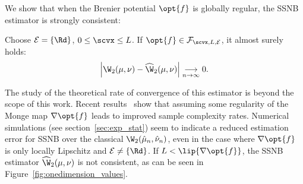 We show that when the Brenier potential $\opt{f}$ is globally regular, the SSNB estimator is strongly consistent:
\begin{proposition}\label{prop:estimation:L2}
Choose $\mathcal{E} = \{\Rd\}$, $0 \leq \scvx \leq L$. If $\opt{f} \in \mathcal{F}_{\scvx, L, \mathcal{E}}$, it almost surely holds:
\[
    \left\vert \W_2(\mu, \nu) - \widehat \W_2(\mu,\nu) \right\vert
    \underset{n \to \infty}{\longrightarrow} 0.
\]
\end{proposition}
The study of the theoretical rate of convergence of this estimator is beyond the scope of this work. Recent results~\citep{hutter2019minimax,flamary2019concentration} show that assuming some regularity of the Monge map $\nabla \opt{f}$ leads to improved sample complexity rates. Numerical simulations (see section~\ref{sec:exp_stat}) seem to indicate a reduced estimation error for SSNB over the classical $\W_2(\hat\mu_n, \hat\nu_n)$, even in the case where $\nabla \opt{f}$ is only locally Lipschitz and $\mathcal{E} \neq \{\Rd\}$. If $L < \lip{\nabla \opt{f}}$, the SSNB estimator $\widehat\W_2(\mu,\nu)$ is not consistent, as can be seen in Figure~\ref{fig:onedimension_values}.